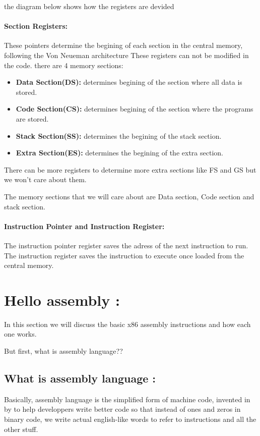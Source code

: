 \documentclass[10pt]{article}
\begin{document}
    the diagram below shows how the registers are devided
    \paragraph{Section Registers: }These pointers determine the begining of each section in the central memory, 
    following the Von Neueman architecture
    These registers can not be modified in the code.
    there are 4 memory sections:
    \begin{itemize}
        \item \textbf{Data Section(DS): }determines begining of the section where all data is stored.
        \item \textbf{Code Section(CS): }determines begining of the section where the programs are stored.
        \item \textbf{Stack Section(SS): }determines the begining of the stack section.
        \item \textbf{Extra Section(ES): }determines the begining of the extra section.
    \end{itemize}
    There can be more registers to determine more extra sections like FS and GS but we won't care about them.

    The memory sections that we will care about are Data section, Code section and stack section.

    \paragraph{Instruction Pointer and Instruction Register: }The instruction pointer register saves the adress of the next instruction to run.
    The instruction register saves the instruction to execute once loaded from the central memory.
    \newpage
    
    \section{Hello assembly : }
    \tabto{20pt}In this section we will discuss the basic x86 assembly instructions and how each one works.
    
    But first, what is assembly language??
    \subsection{What is assembly language : }
    \tabto{20pt}Basically, assembly language is the simplified form of machine code, invented in %
    by %
    to help developpers write better code so that instead of ones and zeros in binary code, we write actual english-like words to refer to instructions and
    all the other stuff.
\end{document}

